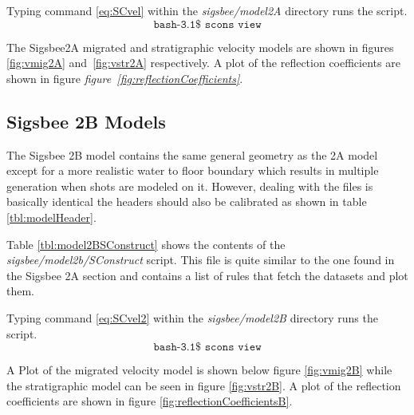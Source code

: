{
\tiny

\normalsize
}

Typing command \ref{eq:SCvel} within the \emph{sigsbee/model2A} directory runs the script.
\begin{equation}\label{eq:SCvel} \texttt{bash-3.1\$\ scons\ view} \end{equation}

The Sigsbee2A migrated and stratigraphic velocity models are shown in figures \ref{fig:vmig2A} and~\ref{fig:vstr2A} respectively.  
A plot of the reflection coefficients are shown in figure \emph{figure~\ref{fig:reflectionCoefficients}}.  


\subsection{Sigsbee 2B Models}
The Sigsbee 2B model contains the same general geometry as the 2A model except for a more realistic water to floor boundary which 
results in multiple generation when shots are modeled on it.  However, dealing with the files is basically identical the headers should 
also be calibrated as shown in table \ref{tbl:modelHeader}. 

Table \ref{tbl:model2BSConstruct} shows the contents of the \emph{sigsbee/model2b/SConstruct} script.  This file is quite similar to 
the one found in the Sigsbee 2A section and contains a list of rules that fetch the datasets and plot them.  

{
\tiny

\normalsize
}

Typing command \ref{eq:SCvel2} within the \emph{sigsbee/model2B} directory runs the script.
\begin{equation}\label{eq:SCvel2} \texttt{bash-3.1\$\ scons\ view} \end{equation}
 
A Plot of the migrated velocity model is shown below figure \ref{fig:vmig2B} while the stratigraphic model can be seen 
in figure \ref{fig:vstr2B}.  A plot of the reflection coefficients are shown in figure \ref{fig:reflectionCoefficientsB}.

